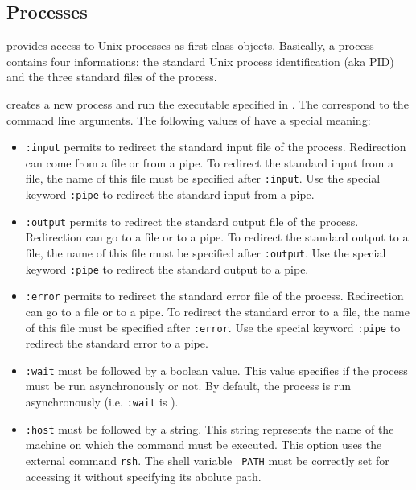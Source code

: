 
\subsection{Processes}

\label{process-type}
{\stk} provides access to Unix processes as first class objects. Basically,
a process contains four informations: the standard Unix process
identification (aka PID) and the three standard files
of the process.

\begin{entry}{
}
\saut
{} creates a new process and run the executable
specified in . The  correspond to the command line
arguments. The following values of  have a special meaning:
\begin{itemize}
\item {\tt :input} permits to redirect the standard input file of the
process. Redirection can come from a file or from a pipe. To redirect
the standard input from a file, the name of this file must be
specified after {\tt :input}. Use the special keyword {\tt :pipe} to
redirect the standard input from a pipe. 

\item {\tt :output} permits to redirect the standard output file of the
process. Redirection can go to a file or to a pipe. To redirect
the standard output to a file, the name of this file must be
specified after {\tt :output}. Use the special keyword {\tt :pipe} to
redirect the standard output to a pipe.

\item {\tt :error} permits to redirect the standard error file of the
process. Redirection can go to a file or to a pipe. To redirect
the standard error to a file, the name of this file must be
specified after {\tt :error}. Use the special keyword {\tt :pipe} to
redirect the standard error to a pipe.

\item {\tt :wait} must be followed by a boolean value. This value
specifies if the process must be run asynchronously or not. By
default, the process is run asynchronously (i.e. {\tt :wait} is
\schfalse).

\item {\tt :host} must be followed by a string. This string represents
the name of the machine on which the command must be executed. This
option uses the external command {\tt rsh}. The shell variable {\tt
PATH} must be correctly set for accessing it without specifying its
abolute path.


\end{itemize}
\end{entry}

